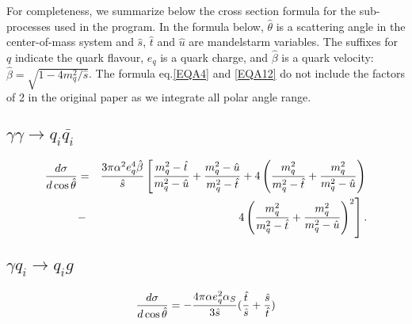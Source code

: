 For completeness, we summarize below the cross section formula 
for the sub-processes used in the program\cite{HARDCROS}.
In the formula below, $\hat{\theta}$ is a scattering angle in 
the center-of-mass system and $\hat{s}$, $\hat{t}$ and $\hat{u}$ are
mandelstarm variables.  The suffixes for $q$ indicate the quark
flavour,
$e_q$ is a quark charge, and $\hat{\beta}$ is a quark velocity: 
$\hat{\beta}=\sqrt{1-4m^2_q/\hat{s}}$.
The formula eq.\ref{EQA4} and \ref{EQA12} do not include
the factors of 2 in the original paper as we integrate
all polar angle range.  


%


\subsection{$\gamma\gamma \rightarrow q_i\bar{q_i}$ }
\begin{eqnarray}
{d\sigma \over d\cos\hat{\theta}} &=&
{3\pi\alpha^2 e_q^4 \hat{\beta} \over \hat{s} } \left[
\frac{m^2_q -\hat{t}}{m^2_q-\hat{u}}  +
 \frac{m^2_q -\hat{u}}{m^2_q-\hat{t}} +
 4 \left( \frac{m^2_q}{m^2_q-\hat{t}} + \frac{m^2_q}{m^2_q-\hat{u}}  
  \right) \right. \nonumber \\
&-& \left. 4  \left( \frac{m^2_q}{m^2_q-\hat{t}} +
\frac{m^2_q}{m^2_q-\hat{u}}  
  \right)^2 \right].
\end{eqnarray}

\subsection{$\gamma q_i \rightarrow q_i g $ }
\begin{equation}
{d\sigma \over d\cos\hat{\theta}} = - { 4\pi\alpha e_q^2 \alpha_S \over 3\hat{s}}
( \frac{\hat{t}}{\hat{s}} + \frac{\hat{s}}{\hat{t}} )
\end{equation}

